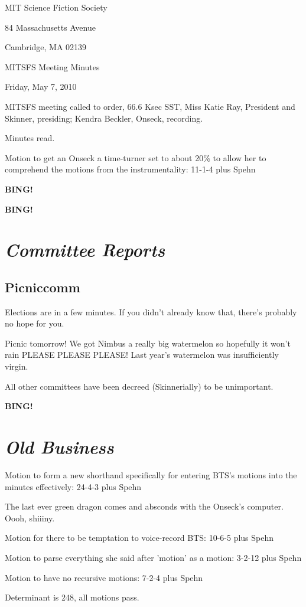 \documentclass[10pt]{article}
\newcommand{\bing}{{\bf BING!} }
\newcommand{\goto}[1]{\bing \vskip 12pt \section*{{\em{#1}}}}
\newcommand{\ps}{ plus Spehn\xspace}
\newcommand{\skinner}{Miss Katie Ray, President and Skinner}
\newcommand{\onseck}{Kendra Beckler, Onseck}
\newcommand{\meetingdate}{Friday, May 7, 2010}
\begin{document}
\begin{center}

MIT Science Fiction Society

84 Massachusetts Avenue

Cambridge, MA 02139

\vspace{12pt}

MITSFS Meeting Minutes

\meetingdate

\end{center}

\vspace{18pt}

\setlength{\parskip}{6pt}

\noindent
MITSFS meeting called to order, 66.6 Ksec SST,
\skinner, presiding; \onseck, recording.

Minutes read.

Motion to get an Onseck a time-turner set to about 20\% to allow her to comprehend the motions from the instrumentality: 11-1-4 \ps

\bing

\goto{Committee Reports}

\subsection*{Picniccomm}

Elections are in a few minutes.  If you didn't already know that, there's probably no hope for you.

Picnic tomorrow!  We got Nimbus a really big watermelon so hopefully it won't rain PLEASE PLEASE PLEASE!  Last year's watermelon was insufficiently virgin.

All other committees have been decreed (Skinnerially) to be unimportant.

\goto{Old Business}

Motion to form a new shorthand specifically for entering BTS's motions into the minutes effectively: 24-4-3 \ps

The last ever green dragon comes and absconds with the Onseck's computer.  Oooh, shiiiny.

Motion for there to be temptation to voice-record BTS: 10-6-5 \ps

Motion to parse everything she said after 'motion' as a motion: 3-2-12 \ps

Motion to have no recursive motions: 7-2-4 \ps

Determinant is 248, all motions pass.
\end{document}
